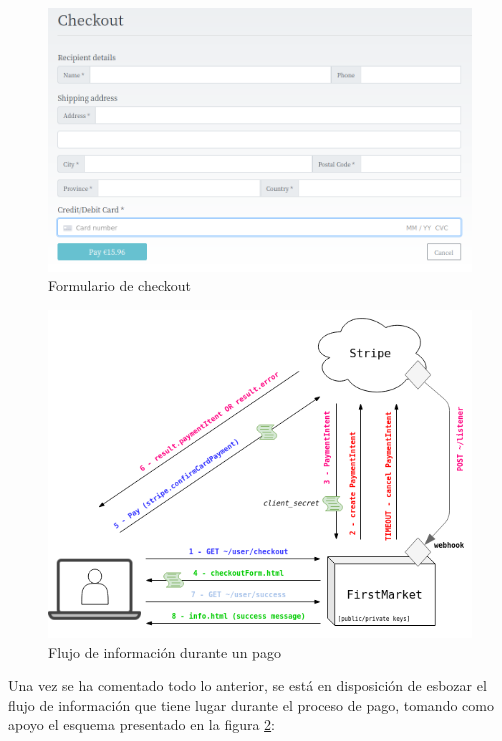 \documentclass[a4paper,12pt,twoside,openright]{report}
\begin{document}
    \begin{figure}[hbt!]
    	\centering
    	\includegraphics[width=\textwidth,keepaspectratio]{checkout_form}
    	\caption{Formulario de checkout}
    	\label{fig:checkout_form}
    \end{figure}
    
    \begin{figure}[hbt!]
    	\centering
    	\includegraphics[width=\textwidth,keepaspectratio]{stripe}
    	\caption{Flujo de información durante un pago}
    	\label{fig:stripe}
    \end{figure}
    
    Una vez se ha comentado todo lo anterior, se está en disposición de esbozar el flujo de información que tiene lugar durante el proceso de pago, tomando como apoyo el esquema presentado en la figura \ref{fig:stripe}:
    
\end{document}
